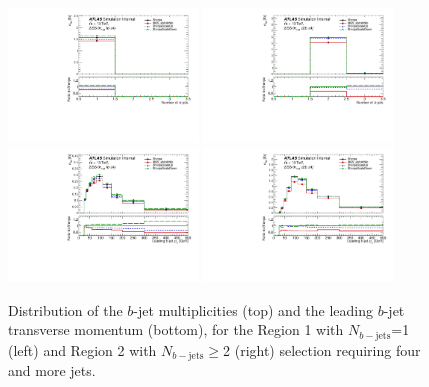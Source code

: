 \begin{figure}[!htb]
\centering
\includegraphics[width=0.45\textwidth]{Plots/ttV/generator/c_Region_0_nBtagJets}
\includegraphics[width=0.45\textwidth]{Plots/ttV/generator/c_Region_1_nBtagJets}\\
\includegraphics[width=0.45\textwidth]{Plots/ttV/generator/c_Region_0_Bjet_Pt_0}
\includegraphics[width=0.45\textwidth]{Plots/ttV/generator/c_Region_1_Bjet_Pt_0}\\
  \caption{Distribution of the $b$-jet multiplicities (top) and the leading $b$-jet transverse momentum (bottom), for the Region 1 with $N_{b-\mathrm{jets}}$=1 (left) and Region 2 with $N_{b-\mathrm{jets}}\geq$2 (right) selection requiring four and more jets.  \label{ttV:den_4jbinfo}}
\end{figure}



